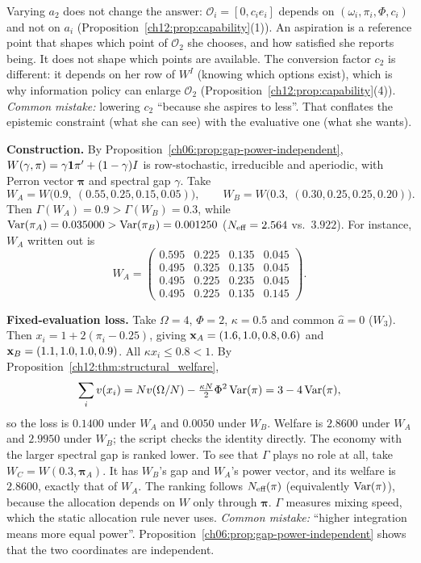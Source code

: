 \documentclass[../solutions_manual.tex]{subfiles}
\begin{document}
Varying $a_2$ does not change the answer: $\mathcal{O}_i = [0, c_ie_i]$ depends on $(\omega_i, \pi_i, \Phi, c_i)$ and not on $a_i$ (Proposition~\ref{ch12:prop:capability}(1)). An aspiration is a reference point that shapes which point of $\mathcal{O}_2$ she chooses, and how satisfied she reports being. It does not shape which points are available. The conversion factor $c_2$ is different: it depends on her row of $W^I$ (knowing which options exist), which is why information policy can enlarge $\mathcal{O}_2$ (Proposition~\ref{ch12:prop:capability}(4)). \textit{Common mistake:} lowering $c_2$ ``because she aspires to less''. That conflates the epistemic constraint (what she can see) with the evaluative one (what she wants).

\textbf{Construction.} By Proposition~\ref{ch06:prop:gap-power-independent}, $W(\gamma, \pi) = \gamma\mathbf{1}\pi' + (1-\gamma)I$ is row-stochastic, irreducible and aperiodic, with Perron vector $\boldsymbol{\pi}$ and spectral gap $\gamma$. Take
\[
W_A = W\big(0.9,\ (0.55, 0.25, 0.15, 0.05)\big), \qquad W_B = W\big(0.3,\ (0.30, 0.25, 0.25, 0.20)\big).
\]
Then $\Gamma(W_A) = 0.9 > \Gamma(W_B) = 0.3$, while $\operatorname{Var}(\pi_A) = 0.035000 > \operatorname{Var}(\pi_B) = 0.001250$ ($N_{\text{eff}} = 2.564$ vs.\ $3.922$). For instance, $W_A$ written out is
\[
W_A = \begin{pmatrix} 0.595 & 0.225 & 0.135 & 0.045 \\ 0.495 & 0.325 & 0.135 & 0.045 \\ 0.495 & 0.225 & 0.235 & 0.045 \\ 0.495 & 0.225 & 0.135 & 0.145 \end{pmatrix}.
\]

\textbf{Fixed-evaluation loss.} Take $\Omega = 4$, $\Phi = 2$, $\kappa = 0.5$ and common $\hat a = 0$ ($W_3$). Then $x_i = 1 + 2(\pi_i - 0.25)$, giving $\mathbf{x}_A = (1.6, 1.0, 0.8, 0.6)$ and $\mathbf{x}_B = (1.1, 1.0, 1.0, 0.9)$. All $\kappa x_i \le 0.8 < 1$. By Proposition~\ref{ch12:thm:structural_welfare},
\[
\sum_i v(x_i) = N v(\Omega/N) - \tfrac{\kappa N}{2}\Phi^2\operatorname{Var}(\pi) = 3 - 4\operatorname{Var}(\pi),
\]
so the loss is $0.1400$ under $W_A$ and $0.0050$ under $W_B$. Welfare is $2.8600$ under $W_A$ and $2.9950$ under $W_B$; the script checks the identity directly. The economy with the larger spectral gap is ranked lower. To see that $\Gamma$ plays no role at all, take $W_C = W(0.3, \boldsymbol{\pi}_A)$. It has $W_B$'s gap and $W_A$'s power vector, and its welfare is $2.8600$, exactly that of $W_A$. The ranking follows $N_{\text{eff}}(\pi)$ (equivalently $\operatorname{Var}(\pi)$), because the allocation depends on $W$ only through $\boldsymbol{\pi}$. $\Gamma$ measures mixing speed, which the static allocation rule never uses. \textit{Common mistake:} ``higher integration means more equal power''. Proposition~\ref{ch06:prop:gap-power-independent} shows that the two coordinates are independent.
\end{document}
